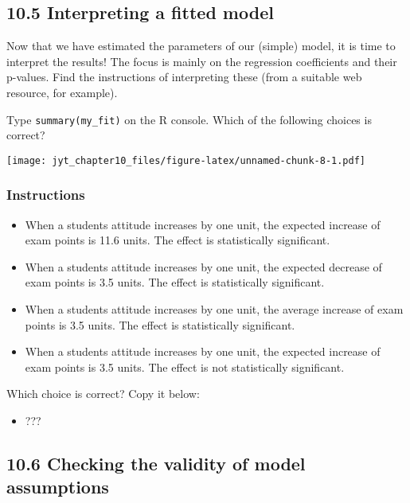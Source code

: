\documentclass[]{article}
\providecommand{\tightlist}{%
  \setlength{\itemsep}{0pt}\setlength{\parskip}{0pt}}
\begin{document}
\hypertarget{interpreting-a-fitted-model}{%
\subsection{10.5 Interpreting a fitted
model}\label{interpreting-a-fitted-model}}

Now that we have estimated the parameters of our (simple) model, it is
time to interpret the results! The focus is mainly on the regression
coefficients and their p-values. Find the instructions of interpreting
these (from a suitable web resource, for example).

Type \texttt{summary(my\_fit)} on the R console. Which of the following
choices is correct?

\texttt{[image: jyt\_chapter10\_files/figure-latex/unnamed-chunk-8-1.pdf]}

\hypertarget{instructions-4}{%
\subsubsection{Instructions}\label{instructions-4}}

\begin{itemize}
\tightlist
\item
  When a students attitude increases by one unit, the expected increase
  of exam points is 11.6 units. The effect is statistically significant.
\item
  When a students attitude increases by one unit, the expected decrease
  of exam points is 3.5 units. The effect is statistically significant.
\item
  When a students attitude increases by one unit, the average increase
  of exam points is 3.5 units. The effect is statistically significant.
\item
  When a students attitude increases by one unit, the expected increase
  of exam points is 3.5 units. The effect is not statistically
  significant.
\end{itemize}

Which choice is correct? Copy it below:

\begin{itemize}
\tightlist
\item
  ???
\end{itemize}

\hypertarget{checking-the-validity-of-model-assumptions}{%
\subsection{10.6 Checking the validity of model
assumptions}\label{checking-the-validity-of-model-assumptions}}
\end{document}
